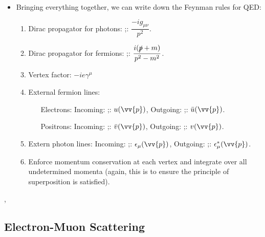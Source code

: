 \begin{itemize}
    \item Bringing everything together, we can write down the Feynman rules for QED:
    \begin{enumerate}
        \item Dirac propagator for photons: ;: $\dfrac{-ig_{\mu\nu}}{p^2}$.
        \item Dirac propagator for fermions: ;: $\dfrac{i(\slashed{p} + m)}{p^2-m^2}$.
        \item Vertex factor: $-ie\gamma^{\mu}$
        \item External fermion lines:
            \begin{enumerate}[leftmargin=0.5in, align=left]
                    \item[Electrons:] Incoming: ;: $u(\vv{p})$, \hspace{5mm} Outgoing: ;: $\bar{u}(\vv{p})$.
                    \item[Positrons:] Incoming: ;: $\bar{v}(\vv{p})$, \hspace{5mm} Outgoing: ;: $v(\vv{p})$.
            \end{enumerate}
        \item Extern photon lines: Incoming: ;: $\epsilon_{\mu}(\vv{p})$, \hspace{5mm} Outgoing: ;: $\epsilon^*_{\mu}(\vv{p})$.
        \item Enforce momentum conservation at each vertex and integrate over all undetermined momenta (again, this is to ensure the principle of superposition is satisfied).
    \end{enumerate}
\end{itemize}



\sep 


\subsection*{Electron-Muon Scattering}

